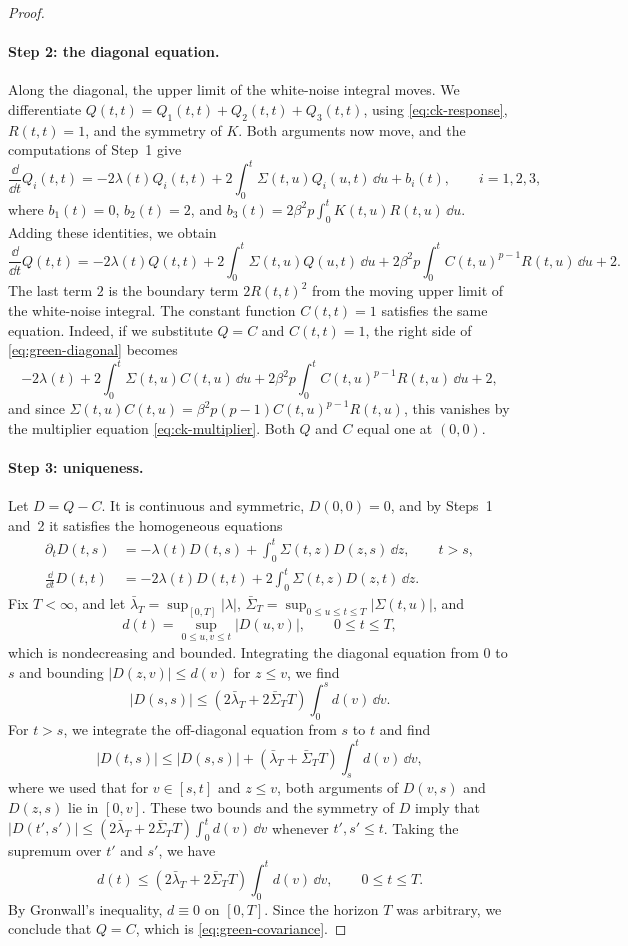 \begin{proof}
\paragraph{Step 2: the diagonal equation.}
Along the diagonal, the upper limit of the white-noise integral moves. We differentiate $Q(t,t)=Q_1(t,t)+Q_2(t,t)+Q_3(t,t)$, using \eqref{eq:ck-response}, $R(t,t)=1$, and the symmetry of $K$. Both arguments now move, and the computations of Step~1 give
\[
 \frac{\dd}{\dd t}Q_i(t,t)
 =-2\lambda(t)Q_i(t,t)
  +2\int_0^t\Sigma(t,u)Q_i(u,t)\,\dd u+b_i(t),
 \qquad i=1,2,3,
\]
where $b_1(t)=0$, $b_2(t)=2$, and $b_3(t)=2\beta^2p\int_0^tK(t,u)R(t,u)\,\dd u$. Adding these identities, we obtain
\begin{equation}\label{eq:green-diagonal}
\frac{\dd}{\dd t}Q(t,t)
=-2\lambda(t)Q(t,t)
 +2\int_0^t\Sigma(t,u)Q(u,t)\,\dd u
 +2\beta^2p\int_0^t C(t,u)^{p-1}R(t,u)\,\dd u+2.
\end{equation}
The last term $2$ is the boundary term $2R(t,t)^2$ from the moving upper limit of the white-noise integral. The constant function $C(t,t)=1$ satisfies the same equation. Indeed, if we substitute $Q=C$ and $C(t,t)=1$, the right side of \eqref{eq:green-diagonal} becomes
\[
 -2\lambda(t)+2\int_0^t\Sigma(t,u)C(t,u)\,\dd u+2\beta^2p\int_0^tC(t,u)^{p-1}R(t,u)\,\dd u+2,
\]
and since $\Sigma(t,u)C(t,u)=\beta^2p(p-1)C(t,u)^{p-1}R(t,u)$, this vanishes by the multiplier equation \eqref{eq:ck-multiplier}. Both $Q$ and $C$ equal one at $(0,0)$.

\paragraph{Step 3: uniqueness.}
Let $D=Q-C$. It is continuous and symmetric, $D(0,0)=0$, and by Steps~1 and~2 it satisfies the homogeneous equations
\[
\begin{aligned}
 \partial_tD(t,s)&=-\lambda(t)D(t,s)+\int_0^t\Sigma(t,z)D(z,s)\,\dd z,\qquad t>s,\\
 \frac{\dd}{\dd t}D(t,t)&=-2\lambda(t)D(t,t)+2\int_0^t\Sigma(t,z)D(z,t)\,\dd z.
\end{aligned}
\]
Fix $T<\infty$, and let $\bar\lambda_T=\sup_{[0,T]}|\lambda|$, $\bar\Sigma_T=\sup_{0\le u\le t\le T}|\Sigma(t,u)|$, and
\[
 d(t)=\sup_{0\le u,v\le t}|D(u,v)|,\qquad 0\le t\le T,
\]
which is nondecreasing and bounded. Integrating the diagonal equation from $0$ to $s$ and bounding $|D(z,v)|\le d(v)$ for $z\le v$, we find
\[
 |D(s,s)|\le(2\bar\lambda_T+2\bar\Sigma_TT)\int_0^sd(v)\,\dd v.
\]
For $t>s$, we integrate the off-diagonal equation from $s$ to $t$ and find
\[
 |D(t,s)|\le|D(s,s)|+(\bar\lambda_T+\bar\Sigma_TT)\int_s^td(v)\,\dd v,
\]
where we used that for $v\in[s,t]$ and $z\le v$, both arguments of $D(v,s)$ and $D(z,s)$ lie in $[0,v]$. These two bounds and the symmetry of $D$ imply that $|D(t',s')|\le(2\bar\lambda_T+2\bar\Sigma_TT)\int_0^td(v)\,\dd v$ whenever $t',s'\le t$. Taking the supremum over $t'$ and $s'$, we have
\[
 d(t)\le(2\bar\lambda_T+2\bar\Sigma_TT)\int_0^td(v)\,\dd v,\qquad 0\le t\le T.
\]
By Gronwall's inequality, $d\equiv0$ on $[0,T]$. Since the horizon $T$ was arbitrary, we conclude that $Q=C$, which is \eqref{eq:green-covariance}.


\end{proof}
